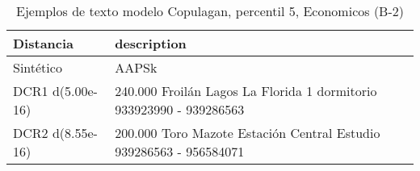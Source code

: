 \begin{table}[H]
\centering
\fontsize{10}{14}\selectfont
\caption{Ejemplos de texto modelo Copulagan, percentil 5, Economicos (B-2)}
\label{table-example-economicos-b-2-copulagan-5p-text}
\begin{tabular}{|l|m{35em}|}
\hline
\rowcolor[gray]{0.8}
Distancia & description \\
\hline Sintético & AAPSk \\
\hline DCR1 d(5.00e-16) & 240.000 Froil\'an Lagos La Florida 1 dormitorio 933923990 -  939286563 \\
\hline DCR2 d(8.55e-16) & 200.000 Toro Mazote Estaci\'on Central Estudio 939286563 - 956584071 \\
\hline
\end{tabular}
\end{table}
